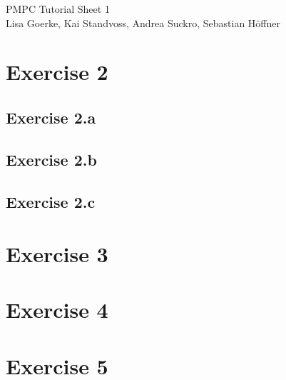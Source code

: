 \documentclass{article}
\begin{document}
\LARGE PMPC Tutorial Sheet 1\\
\small Lisa Goerke, Kai Standvoss, Andrea Suckro, Sebastian H\"offner
\vspace{0.5cm}
\normalsize


\section*{Exercise 2}
\subsection*{Exercise 2.a}




\subsection*{Exercise 2.b}


\subsection*{Exercise 2.c}



\section*{Exercise 3}


\section*{Exercise 4}


\section*{Exercise 5}
\end{document}

